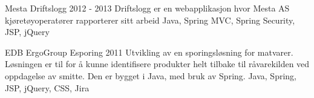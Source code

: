 \begin{cventries}
    \kunde
    {Mesta} %
    \project
    {Driftslogg}
    {2012 - 2013}
    {Driftslogg er en webapplikasjon hvor Mesta AS kjøretøyoperatører rapporterer sitt arbeid}
    {Java, Spring MVC, Spring Security, JSP, jQuery}


    \kunde
    {EDB ErgoGroup} %
    \project
    {Esporing}
    {2011}
    {Utvikling av en sporingsløsning for matvarer. Løsningen er til for å kunne identifisere produkter helt tilbake til råvarekilden ved oppdagelse av smitte. Den er bygget i Java, med bruk av Spring.}
    {Java, Spring, JSP, jQuery, CSS, Jira}

\end{cventries}
